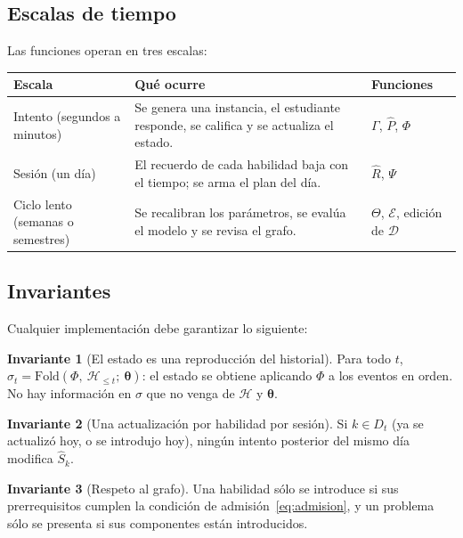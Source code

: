 \documentclass[11pt]{article}
\theoremstyle{definition}
\newtheorem{invariante}{Invariante}
\theoremstyle{remark}
\newcommand{\Rh}{\hat R}
\newcommand{\Sh}{\hat S}
\newcommand{\Hist}{\mathcal H}
\newcommand{\Dom}{\mathcal D}
\begin{document}
\subsection{Escalas de tiempo}

Las funciones operan en tres escalas:

\begin{center}\small
\begin{tabularx}{\textwidth}{@{}lXX@{}}
\toprule
Escala & Qué ocurre & Funciones \\
\midrule
Intento (segundos a minutos) & Se genera una instancia, el estudiante responde, se califica y se actualiza el estado. & $\Gamma$, $\hat P$, $\Phi$ \\
Sesión (un día) & El recuerdo de cada habilidad baja con el tiempo; se arma el plan del día. & $\Rh$, $\Psi$ \\
Ciclo lento (semanas o semestres) & Se recalibran los parámetros, se evalúa el modelo y se revisa el grafo. & $\Theta$, $\mathcal E$, edición de $\Dom$ \\
\bottomrule
\end{tabularx}
\end{center}

\subsection{Invariantes}

Cualquier implementación debe garantizar lo siguiente:

\begin{invariante}[El estado es una reproducción del historial]
\label{inv:replay}
Para todo $t$, $\sigma_t=\mathrm{Fold}(\Phi,\ \Hist_{\le t};\ \bm\theta)$: el estado se obtiene aplicando $\Phi$ a los eventos en orden. No hay información en $\sigma$ que no venga de $\Hist$ y $\bm\theta$.
\end{invariante}

\begin{invariante}[Una actualización por habilidad por sesión]
Si $k\in D_t$ (ya se actualizó hoy, o se introdujo hoy), ningún intento posterior del mismo día modifica $\Sh_k$.
\end{invariante}

\begin{invariante}[Respeto al grafo]
Una habilidad sólo se introduce si sus prerrequisitos cumplen la condición de admisión~\eqref{eq:admision}, y un problema sólo se presenta si sus componentes están introducidos.
\end{invariante}
\end{document}
